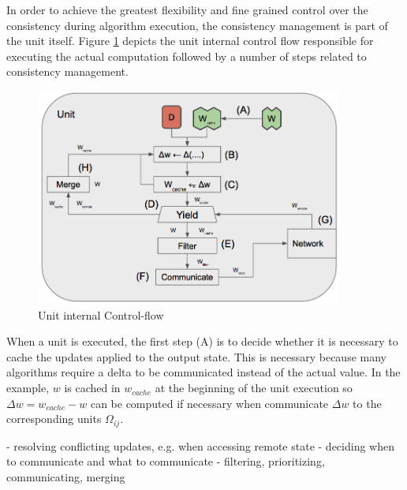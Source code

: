 In order to achieve the greatest flexibility and fine grained control over the consistency during algorithm execution, the consistency management is part of the unit itself.
Figure \ref{fig:unit_internal_flow} depicts the unit internal control flow responsible for executing the actual computation followed by a number of steps related to consistency management.
\begin{figure}[ht]
\centering
\includegraphics[width=0.9\textwidth]{img/unit_internal_flow.png}
\caption{Unit internal Control-flow}
\label{fig:unit_internal_flow}
\end{figure}
When a unit is executed, the first step (A) is to decide whether it is necessary to cache the updates applied to the output state.
This is necessary because many algorithms require a delta to be communicated instead of the actual value.
In the example, $w$ is cached in $w_{cache}$ at the beginning of the unit execution so $\Delta w = w_{cache} - w$ can be computed if necessary when communicate $\Delta w$ to the corresponding units $\Omega_{ij}$.

- resolving conflicting updates, e.g. when accessing remote state
- deciding when to communicate and what to communicate
- filtering, prioritizing, communicating, merging



	